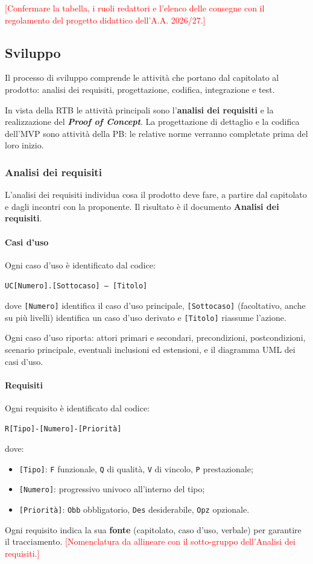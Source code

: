 \documentclass[12pt,a4paper]{article}
\newcommand{\ph}[1]{\textcolor{red}{[#1]}}
\newcommand{\tightlist}{\setlength{\itemsep}{1pt}\setlength{\parskip}{0pt}}
\begin{document}
\ph{Confermare la tabella, i ruoli redattori e l'elenco delle consegne con il regolamento del progetto didattico dell'A.A. 2026/27.}

\subsection{Sviluppo}
Il processo di sviluppo comprende le attività che portano dal capitolato al prodotto: analisi dei requisiti, progettazione, codifica, integrazione e test.

In vista della RTB le attività principali sono l'\textbf{analisi dei requisiti} e la realizzazione del \textbf{\emph{Proof of Concept}}. La progettazione di dettaglio e la codifica dell'MVP sono attività della PB: le relative norme verranno completate prima del loro inizio.

\subsubsection{Analisi dei requisiti}
L'analisi dei requisiti individua cosa il prodotto deve fare, a partire dal capitolato e dagli incontri con la proponente. Il risultato è il documento \textbf{Analisi dei requisiti}.

\paragraph{Casi d'uso}
Ogni caso d'uso è identificato dal codice:
\begin{center}\texttt{UC[Numero].[Sottocaso] -- [Titolo]}\end{center}
dove \texttt{[Numero]} identifica il caso d'uso principale, \texttt{[Sottocaso]} (facoltativo, anche su più livelli) identifica un caso d'uso derivato e \texttt{[Titolo]} riassume l'azione.

Ogni caso d'uso riporta: attori primari e secondari, precondizioni, postcondizioni, scenario principale, eventuali inclusioni ed estensioni, e il diagramma UML dei casi d'uso.

\paragraph{Requisiti}
Ogni requisito è identificato dal codice:
\begin{center}\texttt{R[Tipo]-[Numero]-[Priorità]}\end{center}
dove:
\begin{itemize}
\tightlist
\item \texttt{[Tipo]}: \texttt{F} funzionale, \texttt{Q} di qualità, \texttt{V} di vincolo, \texttt{P} prestazionale;
\item \texttt{[Numero]}: progressivo univoco all'interno del tipo;
\item \texttt{[Priorità]}: \texttt{Obb} obbligatorio, \texttt{Des} desiderabile, \texttt{Opz} opzionale.
\end{itemize}
Ogni requisito indica la sua \textbf{fonte} (capitolato, caso d'uso, verbale) per garantire il tracciamento.
\ph{Nomenclatura da allineare con il sotto-gruppo dell'Analisi dei requisiti.}
\end{document}
